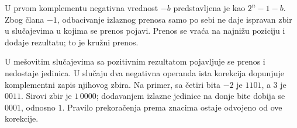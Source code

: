 U prvom komplementu negativna vrednost $-b$ predstavljena je kao $2^n-1-b$. Zbog člana $-1$, odbacivanje izlaznog prenosa samo po sebi ne daje ispravan zbir u slučajevima u kojima se prenos pojavi. Prenos se vraća na najnižu poziciju i dodaje rezultatu; to je kružni prenos.

U mešovitim slučajevima sa pozitivnim rezultatom pojavljuje se prenos i nedostaje jedinica. U slučaju dva negativna operanda ista korekcija dopunjuje komplementni zapis njihovog zbira. Na primer, sa četiri bita $-2$ je $1101$, a $3$ je $0011$. Sirovi zbir je $1\,0000$; dodavanjem izlazne jedinice na donje bite dobija se $0001$, odnosno $1$. Pravilo prekoračenja prema znacima ostaje odvojeno od ove korekcije.
